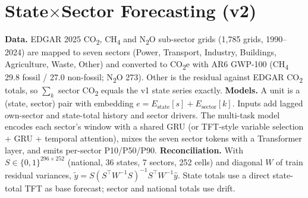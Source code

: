 \documentclass[conference]{IEEEtran}
\begin{document}
\section{State$\times$Sector Forecasting (v2)}
\textbf{Data.} EDGAR 2025 CO\textsubscript{2}, CH\textsubscript{4} and N\textsubscript{2}O sub-sector grids (1,785 grids,
1990--2024) are mapped to seven sectors (Power, Transport, Industry, Buildings, Agriculture, Waste, Other) and converted to
CO\textsubscript{2}e with AR6 GWP-100 (CH\textsubscript{4} 29.8 fossil / 27.0 non-fossil; N\textsubscript{2}O 273). Other is the
residual against EDGAR CO\textsubscript{2} totals, so $\sum_k$ sector CO\textsubscript{2} equals the v1 state series exactly.
\textbf{Models.} A unit is a (state, sector) pair with embedding $e = E_{\text{state}}[s] + E_{\text{sector}}[k]$. Inputs add
lagged own-sector and state-total history and sector drivers. The multi-task model encodes each sector's window with a
shared GRU (or TFT-style variable selection + GRU + temporal attention), mixes the seven sector tokens with a
Transformer layer, and emits per-sector P10/P50/P90.
\textbf{Reconciliation.} With $S\in\{0,1\}^{296\times252}$ (national, 36 states, 7 sectors, 252 cells) and diagonal $W$ of
train residual variances, $\tilde{y}=S(S^\top W^{-1}S)^{-1}S^\top W^{-1}\hat{y}$. State totals use a direct state-total TFT
as base forecast; sector and national totals use drift.

\begin{table}[t]\centering\caption{State$\times$sector test accuracy (material cells, train mean $\ge$10 kt).}\label{tab:sector}
\resizebox{\columnwidth}{!}{}\end{table}
\begin{table}[t]\centering\caption{Reconciled MASE at $h{=}5$ by sector.}\label{tab:bysector}
\resizebox{\columnwidth}{!}{}\end{table}
\end{document}
